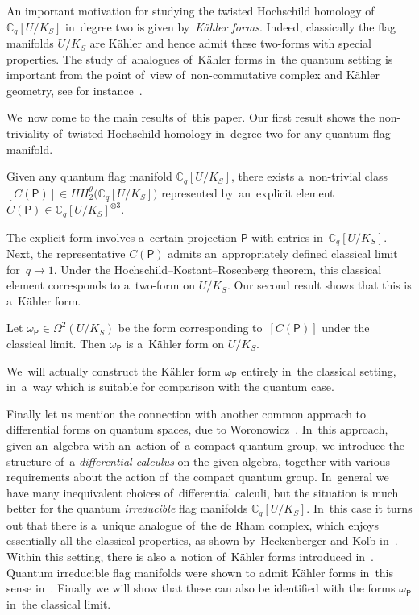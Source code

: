 \documentclass[pdftex]{sigma}
\numberwithin{equation}{section}
\newcommand{\Cqflag}{\mathbb{C}_q[U / K_S]}
\newcommand{\proj}{\mathsf{P}}
\begin{document}
An important motivation for studying the twisted Hoch\-schild homology of~$\Cqflag$ in~degree two is given by~\emph{K\"ahler forms}.
Indeed, classically the flag manifolds $U / K_S$ are K\"ahler and hence admit these two-forms with special properties.
The study of~analogues of~K\"ahler forms in~the quantum setting is important from the point of~view of~non-commutative complex and K\"ahler geometry, see for instance~\cite{besm13, obu16, obu17}.

We~now come to the main results of~this paper.
Our first result shows the non-triviality of~twisted Hoch\-schild homology in~degree two for any quantum flag manifold.

\begin{theorem*}
Given any quantum flag manifold $\Cqflag$, there exists a~non-trivial class $[C(\proj)] \in HH^\theta_2\big(\Cqflag\big)$ represented by~an~explicit element $C(\proj) \in \Cqflag^{\otimes 3}$.
\end{theorem*}

The explicit form involves a~certain projection $\proj$ with entries in~$\Cqflag$.
Next, the representative $C(\proj)$ admits an~appropriately defined classical limit for~$q \to 1$.
Under the Hoch\-schild--Kostant--Rosenberg theorem, this classical element corresponds to a~two-form on $U / K_S$.
Our second result shows that this is a~K\"ahler form.

\begin{theorem*}
Let $\omega_\proj \in \Omega^2(U / K_S)$ be the form corresponding to~$[C(\proj)]$ under the classical limit.
Then $\omega_\proj$ is a~K\"ahler form on $U / K_S$.
\end{theorem*}

We~will actually construct the K\"ahler form $\omega_\proj$ entirely in~the classical setting, in~a~way which is suitable for comparison with the quantum case.

Finally let us mention the connection with another common approach to differential forms on quantum spaces, due to Woronowicz~\cite{woronowicz}.
In~this approach, given an~algebra with an~action of~a compact quantum group, we introduce the structure of~a \emph{differential calculus} on the given algebra, together with various requirements about the action of~the compact quantum group.
In~general we have many inequivalent choices of~differential calculi, but the situation is much better for the quantum \emph{irreducible} flag manifolds $\Cqflag$.
In~this case it turns out that there is a~unique analogue of~the de Rham complex, which enjoys essentially all the classical properties, as shown by~Heckenberger and Kolb in~\cite{heko06}.
Within this setting, there is also a~notion of~K\"ahler forms introduced in~\cite{obu17}.
Quantum irreducible flag manifolds were shown to admit K\"ahler forms in~this sense in~\cite{mat-kahler}.
Finally we will show that these can also be identified with the forms $\omega_\proj$ in~the classical limit.
\end{document}
